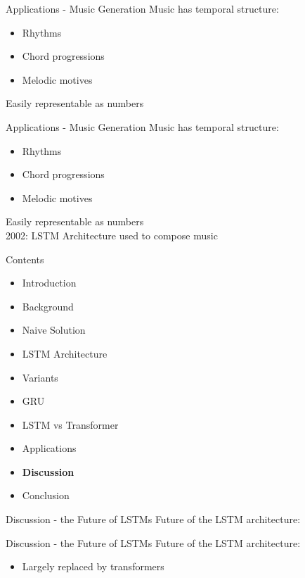 \documentclass[10pt, aspectratio=169]{beamer}
\begin{document}
\begin{frame}[t]{Applications - Music Generation}
Music has temporal structure:
\begin{itemize}
    \item Rhythms
    \item Chord progressions
    \item Melodic motives
\end{itemize}
Easily representable as numbers
\end{frame}

\begin{frame}[t]{Applications - Music Generation}
Music has temporal structure:
\begin{itemize}
    \item Rhythms
    \item Chord progressions
    \item Melodic motives
\end{itemize}
Easily representable as numbers\\
2002: LSTM Architecture used to compose music
\end{frame}

\begin{frame}[t]{Contents}
\begin{itemize}
    \item Introduction
    \item Background
    \item Naive Solution
    \item LSTM Architecture
    \item Variants
    \item GRU
    \item LSTM vs Transformer
    \item Applications
    \item \textbf{Discussion}
    \item Conclusion
\end{itemize}
\end{frame}
\begin{frame}[t]{Discussion - the Future of LSTMs}
Future of the LSTM architecture:
\end{frame}

\begin{frame}[t]{Discussion - the Future of LSTMs}
Future of the LSTM architecture:
\begin{itemize}
    \item Largely replaced by transformers
\end{itemize}
\end{frame}
\end{document}
